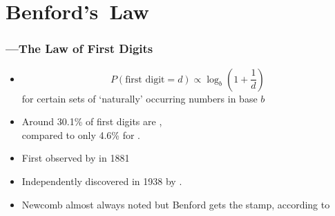 
\section{Benford's\ Law}

\begin{frame}
  \frametitle{---The Law of First Digits}

  \begin{block}{}
    \begin{itemize}
    \item<1-> 
      $$ 
      P(\mbox{first digit} = d) 
      \propto
      \log_b \left( 1 + \frac{1}{d} \right)
      $$
      for certain sets of `naturally' occurring numbers in base $b$
    \item<2-> 
      Around 30.1\% of first digits are , \\
      compared to only 4.6\% for .
    \item<3-> 
      First observed by \cite{newcomb1881a} in 1881\\
    \item<4-> 
      Independently discovered in 1938 by .
    \item<5->
      Newcomb almost always noted but Benford gets the stamp,
      according
      to 
    \end{itemize}
  \end{block}

\end{frame}

